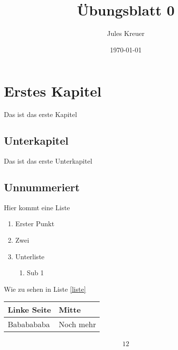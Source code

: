 \documentclass[12pt]{scrartcl}
\begin{document}
	\author{Jules Kreuer}
	\title{Übungsblatt 0}
\date{\today{}}
\maketitle{}
\newpage
\section{Erstes Kapitel}
Das ist das erste Kapitel
\subsection{Unterkapitel}
Das ist das erste Unterkapitel
\subsection*{Unnummeriert}



Hier kommt eine Liste
\label{liste}
\begin{enumerate}[label=\alph*)]
	\item Erster Punkt
	\item Zwei
	\item Unterliste
	\begin{enumerate}
		\item Sub 1
	\end{enumerate}
	
\end{enumerate}
Wie zu sehen in Liste \ref{liste}

\begin{tabular}{|l||l|}
	Linke Seite & Mitte  \\
	\hline
	Bababababa & Noch mehr
\end{tabular}
\begin{align}
12
\end{align}
\end{document}
